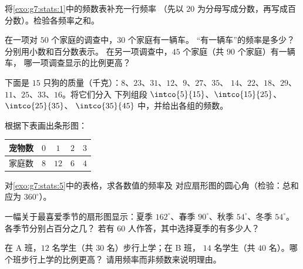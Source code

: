 \begin{exercise}[$\star$]\label{exo:g7:stats:2}
将\cref{exo:g7:stats:1}中的频数表补充一行频率
（先以 $20$ 为分母写成分数，再写成百分数）。检验各频率之和。
\end{exercise}

\begin{exercise}[$\star$]\label{exo:g7:stats:3}
在一项对 $50$ 个家庭的调查中，$30$ 个家庭有一辆车。
“有一辆车”的频率是多少？分别用小数和百分数表示。
在另一项调查中，$45$ 个家庭（共 $90$ 个家庭）有一辆车，
哪一项调查显示的比例更高？
\end{exercise}

\begin{exercise}[$\star$]\label{exo:g7:stats:4}
下面是 $15$ 只狗的质量（千克）：$8$、$23$、$31$、$12$、$9$、$27$、$35$、
$14$、$22$、$18$、$29$、$11$、$25$、$33$、$16$。将它们分入
下列组段 $\intco{5}{15}$、$\intco{15}{25}$、$\intco{25}{35}$、
$\intco{35}{45}$ 中，并给出各组的频数。
\end{exercise}

\begin{exercise}[$\star$]\label{exo:g7:stats:5}
根据下表画出条形图：
\begin{center}
\renewcommand{\arraystretch}{1.2}
\begin{tabular}{l|cccc}
宠物数 & $0$ & $1$ & $2$ & $3$ \\
\hline
家庭数 & $8$ & $12$ & $6$ & $4$ \\
\end{tabular}
\end{center}
\end{exercise}

\begin{exercise}[$\star$]\label{exo:g7:stats:6}
对\cref{exo:g7:stats:5}中的表格，求各数值的频率及
对应扇形图的圆心角（检验：总和应为 $360^\circ$）。
\end{exercise}

\begin{exercise}[$\star$]\label{exo:g7:stats:7}
一幅关于最喜爱季节的扇形图显示：夏季 $162^\circ$、春季
$90^\circ$、秋季 $54^\circ$、冬季 $54^\circ$。各季节分别占百分之几？
若有 $60$ 人作答，其中选择夏季的有多少人？
\end{exercise}

\begin{exercise}[$\star\star$]\label{exo:g7:stats:8}
在 A 班，$12$ 名学生（共 $30$ 名）步行上学；在 B 班，
$14$ 名学生（共 $40$ 名）。哪个班步行上学的比例更高？
请用频率而非频数来说明理由。
\end{exercise}

